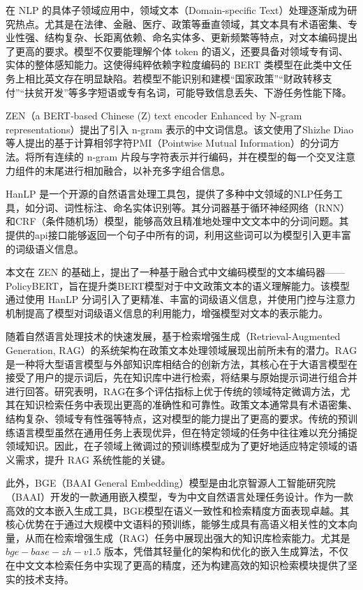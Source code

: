 \documentclass[12pt, a4paper]{ctexart}
\begin{document}
在 NLP 的具体子领域应用中，领域文本（Domain-specific Text）处理逐渐成为研究热点。尤其是在法律、金融、医疗、政策等垂直领域，其文本具有术语密集、专业性强、结构复杂、长距离依赖、命名实体多、更新频繁等特点，对文本编码提出了更高的要求。模型不仅要能理解个体 token 的语义，还要具备对领域专有词、实体的整体感知能力。这使得纯粹依赖字粒度编码的 BERT 类模型在此类中文任务上相比英文存在明显缺陷。若模型不能识别和建模“国家政策”“财政转移支付”“扶贫开发”等多字短语或专有名词，可能导致信息丢失、下游任务性能下降。

ZEN（a BERT‑based Chinese (Z) text encoder Enhanced by N‑gram representations）提出了引入 n‑gram 表示的中文词信息\cite{diao-etal-2020-zen}。该文使用了Shizhe Diao 等人提出的基于计算相邻字符PMI（Pointwise Mutual Information）的分词方法\cite{DXSJSZ2021}。将所有连续的 n‑gram 片段与字符表示并行编码，并在模型的每一个交叉注意力组件的末尾进行相加融合，以补充多字组合信息。

HanLP 是一个开源的自然语言处理工具包，提供了多种中文领域的NLP任务工具，如分词、词性标注、命名实体识别等\cite{he-choi-2021-stem}。其分词器基于循环神经网络（RNN）和CRF（条件随机场）模型，能够高效且精准地处理中文文本中的分词问题。其提供的api接口能够返回一个句子中所有的词，利用这些词可以为模型引入更丰富的词级语义信息。

本文在 ZEN 的基础上，提出了一种基于融合式中文编码模型的文本编码器——PolicyBERT，旨在提升类BERT模型对于中文政策文本的语义理解能力。该模型通过使用 HanLP 分词引入了更精准、丰富的词级语义信息，并使用门控与注意力机制提高了模型对词级语义信息的利用能力，增强模型对文本的表示能力。

\vspace{2em} %

随着自然语言处理技术的快速发展，基于检索增强生成（Retrieval-Augmented Generation, RAG）的系统架构在政策文本处理领域展现出前所未有的潜力。RAG是一种将大型语言模型与外部知识库相结合的创新方法，其核心在于大语言模型在接受了用户的提示词后，先在知识库中进行检索，将结果与原始提示词进行组合并进行回答。研究表明，RAG在多个评估指标上优于传统的领域特定微调方法，尤其在知识检索任务中表现出更高的准确性和可靠性\cite{lakatos2024investigatingperformanceretrievalaugmentedgeneration}。政策文本通常具有术语密集、结构复杂、领域专有性强等特点，这对模型的能力提出了更高的要求。传统的预训练语言模型虽然在通用任务上表现优异，但在特定领域的任务中往往难以充分捕捉领域知识。因此，在子领域上微调过的预训练模型成为了更好地适应特定领域的语义需求，提升 RAG 系统性能的关键。

此外，BGE（BAAI General Embedding）模型是由北京智源人工智能研究院（BAAI）开发的一款通用嵌入模型，专为中文自然语言处理任务设计\cite{bge_embedding}。作为一款高效的文本嵌入生成工具，BGE模型在语义一致性和检索精度方面表现卓越。其核心优势在于通过大规模中文语料的预训练，能够生成具有高语义相关性的文本向量，从而在检索增强生成（RAG）任务中展现出强大的知识库检索能力。尤其是 $bge-base-zh-v1.5$ 版本，凭借其轻量化的架构和优化的嵌入生成算法，不仅在中文文本检索任务中实现了更高的精度，还为构建高效的知识检索模块提供了坚实的技术支持。
\end{document}
